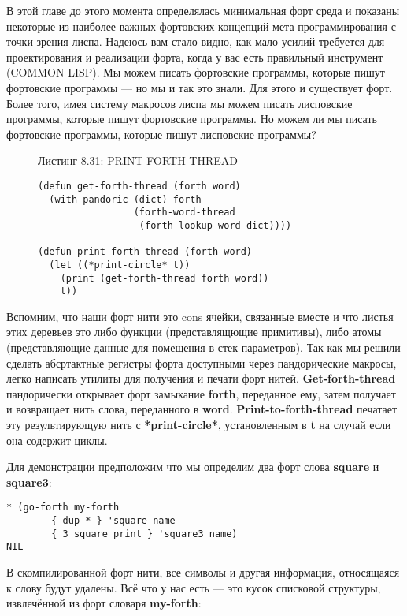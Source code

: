 В этой главе до этого момента определялась минимальная форт среда и показаны некоторые из наиболее важных фортовских концепций мета-программирования с точки зрения лиспа. Надеюсь вам стало видно, как мало усилий требуется для проектирования и реализации форта, когда у вас есть правильный инструмент (COMMON LISP). Мы можем писать фортовские программы, которые пишут фортовские программы --- но мы и так это знали. Для этого и существует форт. Более того, имея систему макросов лиспа мы можем писать лисповские программы, которые пишут фортовские программы. Но можем ли мы писать фортовские программы, которые пишут лисповские программы?

\begin{figure}Листинг 8.31: PRINT-FORTH-THREAD\label{listing_8.31}
\listbegin
\begin{verbatim}
(defun get-forth-thread (forth word)
  (with-pandoric (dict) forth
                 (forth-word-thread
                  (forth-lookup word dict))))

(defun print-forth-thread (forth word)
  (let ((*print-circle* t))
    (print (get-forth-thread forth word))
    t))
\end{verbatim}
\listend
\end{figure}


Вспомним, что наши форт нити это cons ячейки, связанные вместе и что листья этих деревьев это либо функции (представлящющие примитивы), либо атомы (представляющие данные для помещения в стек параметров). Так как мы решили сделать абсртактные регистры форта доступными через пандорические макросы, легко написать утилиты для получения и печати форт нитей. \textbf{Get-forth-thread} пандорически открывает форт замыкание \textbf{forth}, переданное ему, затем получает и возвращает нить слова, переданного в \textbf{word}. \textbf{Print-to-forth-thread} печатает эту результирующую нить с \textbf{*print-circle*}, установленным в \textbf{t} на случай если она содержит циклы.

Для демонстрации предположим что мы определим два форт слова \textbf{square} и \textbf{square3}:

\begin{verbatim}
* (go-forth my-forth
	    { dup * } 'square name
	    { 3 square print } 'square3 name)
NIL
\end{verbatim}

В скомпилированной форт нити, все символы и другая информация, относящаяся к слову будут удалены. Всё что у нас есть --- это кусок списковой структуры, извлечённой из форт словаря \textbf{my-forth}:


